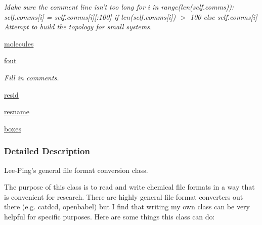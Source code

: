 \begin{DoxyCompactItemize}
\begin{DoxyCompactList}\small\item\em Make sure the comment line isn't too long for i in range(len(self.\-comms))\-: self.\-comms\mbox{[}i\mbox{]} = self.\-comms\mbox{[}i\mbox{]}\mbox{[}\-:100\mbox{]} if len(self.\-comms\mbox{[}i\mbox{]}) $>$ 100 else self.\-comms\mbox{[}i\mbox{]} Attempt to build the topology for small systems. \end{DoxyCompactList}\item 
\hyperlink{classforcebalance_1_1molecule_1_1Molecule_a2537929702245aab6ab293c145730d7c}{molecules}
\item 
\hyperlink{classforcebalance_1_1molecule_1_1Molecule_a2124792d405b58526af41475e4af3c80}{fout}
\begin{DoxyCompactList}\small\item\em Fill in comments. \end{DoxyCompactList}\item 
\hyperlink{classforcebalance_1_1molecule_1_1Molecule_a7ce0cbbc2f774aaffe3b6ca78b658736}{resid}
\item 
\hyperlink{classforcebalance_1_1molecule_1_1Molecule_ac1def400d819601483ddf475f1389a8d}{resname}
\item 
\hyperlink{classforcebalance_1_1molecule_1_1Molecule_a9b3fb36e61a914b9f0e2c1613357736a}{boxes}
\end{DoxyCompactItemize}


\subsubsection{Detailed Description}
Lee-\/\-Ping's general file format conversion class. 

The purpose of this class is to read and write chemical file formats in a way that is convenient for research. There are highly general file format converters out there (e.\-g. catdcd, openbabel) but I find that writing my own class can be very helpful for specific purposes. Here are some things this class can do\-:


